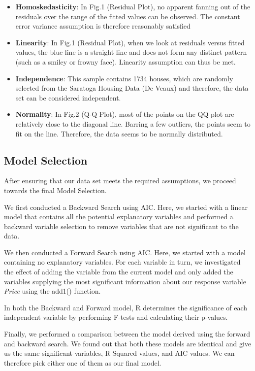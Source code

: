 \documentclass[letterpaper,9pt,twocolumn,twoside,]{pinp}
\providecommand{\tightlist}{%
  \setlength{\itemsep}{0pt}\setlength{\parskip}{0pt}}
\begin{document}
\begin{itemize}
\tightlist
\item
  \textbf{Homoskedasticity}: In Fig.1 (Residual Plot), no apparent
  fanning out of the residuals over the range of the fitted values can
  be observed. The constant error variance assumption is therefore
  reasonably satisfied
\item
  \textbf{Linearity}: In Fig.1 (Residual Plot), when we look at
  residuals versus fitted values, the blue line is a straight line and
  does not form any distinct pattern (such as a smiley or frowny face).
  Linearity assumption can thus be met.
\item
  \textbf{Independence}: This sample contains 1734 houses, which are
  randomly selected from the Saratoga Housing Data (De Veaux) and
  therefore, the data set can be considered independent.
\item
  \textbf{Normality}: In Fig.2 (Q-Q Plot), most of the points on the QQ
  plot are relatively close to the diagonal line. Barring a few
  outliers, the points seem to fit on the line. Therefore, the data
  seems to be normally distributed.
\end{itemize}

\hypertarget{model-selection}{%
\subsection{Model Selection}\label{model-selection}}

After ensuring that our data set meets the required assumptions, we
proceed towards the final Model Selection.

We first conducted a Backward Search using AIC. Here, we started with a
linear model that contains all the potential explanatory variables and
performed a backward variable selection to remove variables that are not
significant to the data.

We then conducted a Forward Search using AIC. Here, we started with a
model containing no explanatory variables. For each variable in turn, we
investigated the effect of adding the variable from the current model
and only added the variables supplying the most significant information
about our response variable \emph{Price} using the add1() function.

In both the Backward and Forward model, R determines the significance of
each independent variable by performing F-tests and calculating their
p-values.

Finally, we performed a comparison between the model derived using the
forward and backward search. We found out that both these models are
identical and give us the same significant variables, R-Squared values,
and AIC values. We can therefore pick either one of them as our final
model.
\end{document}
